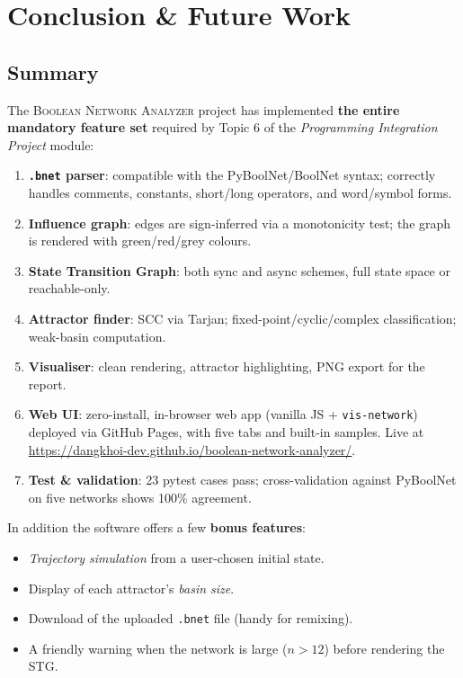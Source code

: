 \documentclass[oneside,final]{hcmut-report}
\begin{document}
\section{Conclusion \& Future Work}\label{sec:conclusion}

\subsection{Summary}\label{subsec:summary}

The \textsc{Boolean Network Analyzer} project has implemented \textbf{the entire mandatory feature set} required by Topic 6 of the \textit{Programming Integration Project} module:

\begin{enumerate}[leftmargin=*]
    \item \checkmark \textbf{\texttt{.bnet} parser}: compatible with the PyBoolNet/BoolNet syntax; correctly handles comments, constants, short/long operators, and word/symbol forms.
    \item \checkmark \textbf{Influence graph}: edges are sign-inferred via a monotonicity test; the graph is rendered with green/red/grey colours.
    \item \checkmark \textbf{State Transition Graph}: both sync and async schemes, full state space or reachable-only.
    \item \checkmark \textbf{Attractor finder}: SCC via Tarjan; fixed-point/cyclic/complex classification; weak-basin computation.
    \item \checkmark \textbf{Visualiser}: clean rendering, attractor highlighting, PNG export for the report.
    \item \checkmark \textbf{Web UI}: zero-install, in-browser web app (vanilla JS + \texttt{vis-network}) deployed via GitHub Pages, with five tabs and built-in samples. Live at \url{https://dangkhoi-dev.github.io/boolean-network-analyzer/}.
    \item \checkmark \textbf{Test \& validation}: 23 pytest cases pass; cross-validation against PyBoolNet on five networks shows 100\% agreement.
\end{enumerate}

In addition the software offers a few \textbf{bonus features}:
\begin{itemize}[leftmargin=*]
    \item \textit{Trajectory simulation} from a user-chosen initial state.
    \item Display of each attractor's \textit{basin size}.
    \item Download of the uploaded \texttt{.bnet} file (handy for remixing).
    \item A friendly warning when the network is large ($n > 12$) before rendering the STG.
\end{itemize}
\end{document}
